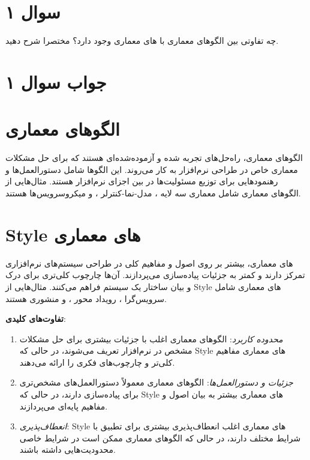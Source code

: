 \section*{سوال ۱}

چه تفاوتی بین الگوهای معماری با 
های معماری وجود دارد؟ مختصرا شرح دهید.

\section*{جواب سوال ۱}

\section*{الگوهای معماری }
الگوهای معماری، راه‌حل‌های تجربه شده و آزموده‌شده‌ای هستند که برای حل مشکلات معماری خاص در طراحی نرم‌افزار به کار می‌روند. این الگوها شامل دستورالعمل‌ها و رهنمودهایی برای توزیع مسئولیت‌ها در بین اجزای نرم‌افزار هستند. مثال‌هایی از الگوهای معماری شامل معماری سه لایه  ، مدل-نما-کنترلر ، و میکروسرویس‌ها  هستند.

\section*{Style های معماری }
 های معماری، بیشتر بر روی اصول و مفاهیم کلی در طراحی سیستم‌های نرم‌افزاری تمرکز دارند و کمتر به جزئیات پیاده‌سازی می‌پردازند. آن‌ها چارچوب کلی‌تری برای درک و بیان ساختار یک سیستم فراهم می‌کنند. مثال‌هایی از Style های معماری شامل سرویس‌گرا ، رویداد محور ، و منشوری  هستند.

\textbf{تفاوت‌های کلیدی}:
\begin{enumerate}
	\item \textit{محدوده کاربرد}: الگوهای معماری اغلب با جزئیات بیشتری برای حل مشکلات مشخص در نرم‌افزار تعریف می‌شوند، در حالی که Style های معماری مفاهیم کلی‌تر و چارچوب‌های فکری را ارائه می‌دهند.
	\item \textit{جزئیات و دستورالعمل‌ها}: الگوهای معماری معمولاً دستورالعمل‌های مشخص‌تری برای پیاده‌سازی دارند، در حالی که Style های معماری بیشتر به بیان اصول و مفاهیم پایه‌ای می‌پردازند.
	\item \textit{انعطاف‌پذیری}: Style های معماری اغلب انعطاف‌پذیری بیشتری برای تطبیق با شرایط مختلف دارند، در حالی که الگوهای معماری ممکن است در شرایط خاصی محدودیت‌هایی داشته باشند.
\end{enumerate}

